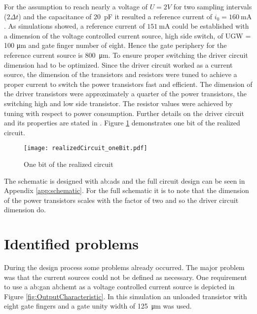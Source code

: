 For the assumption to reach nearly a voltage of $U = 2V$ for two sampling intervals ($2 \Delta t$) and the capacitance of \SI{20}{\pico \farad} it resulted a reference current of $i_0 = \SI{160}{\milli \ampere}$.
As simulations showed, a reference current of $\SI{151}{\milli \ampere}$ could be established with a dimension of the voltage controlled current source, high side switch, of UGW = 100 \si{\micro \meter} and gate finger number of eight.
Hence the gate periphery for the reference current source is \SI{800}{\micro \meter}.
To ensure proper switching the driver circuit dimension had to be optimized.
Since the driver circuit worked as a current source, the dimension of the transistors and resistors were tuned to achieve a proper current to switch the power transistors fast and efficient.
The dimension of the driver transistors were approximately a quarter of the power transistors, the switching high and low side transistor.
The resistor values were achieved by tuning with respect to power consumption.
Further details on the driver circuit and its properties are stated in \cite{MaksimovicPaper}.
Figure \ref{fig:RealCircOne} demonstrates one bit of the realized circuit.

\begin{figure}[H]
	\centering
  \texttt{[image: realizedCircuit\_oneBit.pdf]}
	\caption{One bit of the realized circuit}
	\label{fig:RealCircOne}
\end{figure}

The schematic is designed with \gls{ab:ads} and the full circuit design can be seen in Appendix \ref{app:schematic}.
For the full schematic it is to note that the dimension of the power transistors scales with the factor of two and so the driver circuit dimension do.

\section{Identified problems}
During the design process some problems already occurred.
The major problem was that the current sources could not be defined as necessary.
One requirement to use a \gls{ab:gan} \gls{ab:hemt} as a voltage controlled current source is depicted in Figure \ref{fig:OutputCharacteristic}.
In this simulation an unloaded transistor with eight gate fingers and a gate unity width of \SI{125}{\micro \meter} was used.

